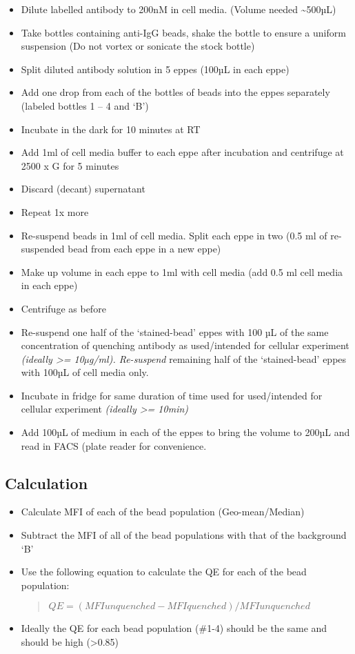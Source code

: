 \documentclass[
  letterpaper,
  DIV=11,
  numbers=noendperiod]{scrartcl}
\begin{document}
\begin{itemize}
\item
  Dilute labelled antibody to 200nM in cell media. (Volume needed
  \textasciitilde500µL)
\item
  Take bottles containing anti-IgG beads, shake the bottle to ensure a
  uniform suspension (Do not vortex or sonicate the stock bottle)
\item
  Split diluted antibody solution in 5 eppes (100µL in each eppe)
\item
  Add one drop from each of the bottles of beads into the eppes
  separately (labeled bottles 1 -- 4 and `B')
\item
  Incubate in the dark for 10 minutes at RT
\item
  Add 1ml of cell media buffer to each eppe after incubation and
  centrifuge at 2500 x G for 5 minutes
\item
  Discard (decant) supernatant
\item
  Repeat 1x more
\item
  Re-suspend beads in 1ml of cell media. Split each eppe in two (0.5 ml
  of re-suspended bead from each eppe in a new eppe)
\item
  Make up volume in each eppe to 1ml with cell media (add 0.5 ml cell
  media in each eppe)
\item
  Centrifuge as before
\item
  Re-suspend one half of the `stained-bead' eppes with 100 µL of the
  same concentration of quenching antibody as used/intended for cellular
  experiment \emph{(ideally \textgreater= 10µg/ml). Re-suspend}
  remaining half of the `stained-bead' eppes with 100µL of cell media
  only.
\item
  Incubate in fridge for same duration of time used for used/intended
  for cellular experiment \emph{(ideally \textgreater= 10min)}
\item
  Add 100µL of medium in each of the eppes to bring the volume to 200µL
  and read in FACS (plate reader for convenience.
\end{itemize}

\hypertarget{calculation}{%
\subsection{Calculation}\label{calculation}}

\begin{itemize}
\item
  Calculate MFI of each of the bead population (Geo-mean/Median)
\item
  Subtract the MFI of all of the bead populations with that of the
  background `B'
\item
  Use the following equation to calculate the QE for each of the bead
  population:

  \begin{quote}
  \(QE = (MFIunquenched - MFIquenched)/MFIunquenched\)
  \end{quote}
\item
  Ideally the QE for each bead population (\#1-4) should be the same and
  should be high (\textgreater0.85)
\end{itemize}
\end{document}
